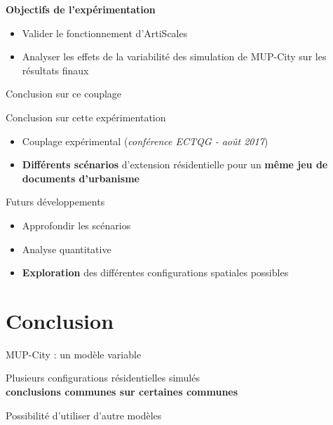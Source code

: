 \documentclass[xcolor=table]{beamer}
\begin{document}
\begin{frame}
	\begin{block}{}
		\textbf{Objectifs de l'expérimentation}\\
		\begin{itemize}
			\item Valider le fonctionnement d'ArtiScales
			\item Analyser les effets de la variabilité des simulation de MUP-City sur les résultats finaux 
		\end{itemize}
	\end{block}
\end{frame}

\begin{frame}{Conclusion sur ce couplage}
	\begin{block}{Conclusion sur cette expérimentation}		
		\begin{itemize}
			\item Couplage expérimental (\textit{conférence ECTQG - août 2017})
			\item \textbf{Différents scénarios} d'extension résidentielle pour un \textbf{même jeu de documents d'urbanisme}
		\end{itemize}
	\end{block}
	\begin{block}{Futurs développements}		
		\begin{itemize}
			\item Approfondir les scénarios
			\item Analyse quantitative
			\item \textbf{Exploration} des différentes configurations spatiales possibles
		\end{itemize}
	\end{block}
\end{frame}




\section{Conclusion}


\begin{frame}{MUP-City : un modèle variable}
\begin{block}{}
	Plusieurs configurations résidentielles simulés
	\\
	\textbf{conclusions communes sur certaines communes}
\end{block}

\begin{block}{}
	Possibilité d'utiliser d'autre modèles 
\end{block}
\end{frame}
\end{document}
